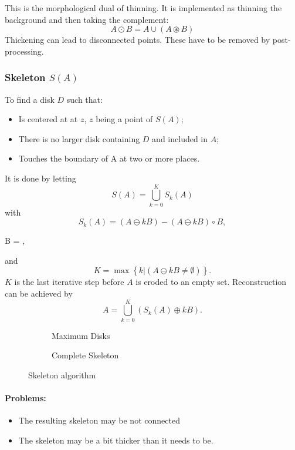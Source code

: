 This is the morphological dual of thinning. It is implemented as thinning the background and then taking the complement:
\[
	A \odot B = A \cup (A \circledast B)
\]
Thickening can lead to disconnected points. These have to be removed by post-processing.

\subsubsection{Skeleton $S(A)$ }

To find a disk $D$ such that:
\begin{itemize}
	\item Is centered at at $z$, $z$ being a point of $S(A)$;
	\item There is no larger disk containing $D$ and included in $A$;
	\item Touches the boundary of A at two or more places.
\end{itemize}
It is done by letting
\[
	S(A) = \bigcup_{k=0}^{K} S_k(A)
\]
with
\[
	S_k(A) = (A \ominus kB) - (A \ominus kB) \circ B,
\]
\begin{center}
	B \quad = \quad {},
\end{center}
and
\[
	K = \max\left\{ k | (A \ominus kB \neq \emptyset) \right\}.
\]
$K$ is the last iterative step before $A$ is eroded to an empty set. Reconstruction can be achieved by
\[
	A = \bigcup_{k=0}^{K}\left( S_k(A) \oplus kB \right).
\]

\begin{figure}[h]
	\centering
	\begin{subfigure}{.45\linewidth}
		\centering
		\caption{Maximum Disks}
	\end{subfigure}
	\begin{subfigure}{.45\linewidth}
		\centering
		\caption{Complete Skeleton}
	\end{subfigure}
	\caption{Skeleton algorithm}
\end{figure}

\paragraph{Problems:}
\begin{itemize}
	\item The resulting skeleton may be not connected
	\item The skeleton may be a bit thicker than it needs to be.
\end{itemize}

